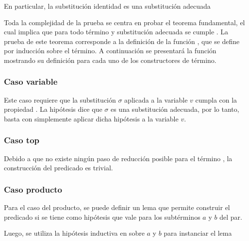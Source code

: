 En particular, la substitución identidad  es una substitución adecuada


Toda la complejidad de la prueba se centra en probar el teorema fundamental, el cual implica que para todo término  y substitución adecuada  se cumple
\snstar{}.
La prueba de este teorema corresponde a la definición de la función , que se define por inducción sobre el término.
A continuación se presentará la función mostrando su definición para cada uno de los constructores de término.


\subsubsection{Caso variable}

Este caso requiere que la substitución $\sigma$ aplicada a la variable $v$ cumpla con la propiedad
\snstar.
La hipótesis dice que $\sigma$ es una substitución adecuada, por lo tanto, basta con simplemente aplicar dicha hipótesis a la variable $v$.


\subsubsection{Caso top}

Debido a que no existe ningún paso de reducción posible para el término \const{$\star$}, la construcción del predicado es trivial.


\subsubsection{Caso producto}

Para el caso del producto, se puede definir un lema que permite construir el predicado si se tiene como hipótesis que \snstar vale para los subtérminos $a$ y $b$ del par.


Luego, se utiliza la hipótesis inductiva en  sobre $a$ y $b$ para instanciar el lema

